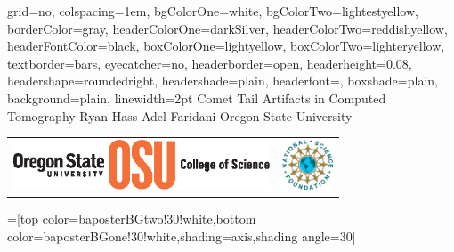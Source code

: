 \documentclass[landscape,final]{baposter}
\begin{document}
\begin{poster}{
  grid=no,
  colspacing=1em,
  bgColorOne=white,
  bgColorTwo=lightestyellow,
  borderColor=gray,
  headerColorOne=darkSilver,
  headerColorTwo=reddishyellow,
  headerFontColor=black,
  boxColorOne=lightyellow,
  boxColorTwo=lighteryellow,
  textborder=bars,
  eyecatcher=no,
  headerborder=open,
  headerheight=0.08\textheight,
  headershape=roundedright,
  headershade=plain,
  headerfont=\Large\textsf, %
  boxshade=plain,
  background=plain,
  linewidth=2pt
  }
  {} %
  {\sf %
  Comet Tail Artifacts in Computed Tomography}
  {\sf %
  Ryan Hass \hspace{3em} Adel Faridani \hspace{3em}
  Oregon State University
  }
  {{\begin{minipage}{30em}
  	
	\begin{tabular}{cc}
    \includegraphics[height=4em]{osu_logo} &
    \includegraphics[height=4em]{nsfe.eps}
    \end{tabular}
  \end{minipage}}
  }

  =[top color=baposterBGtwo!30!white,bottom color=baposterBGone!30!white,shading=axis,shading angle=30]

     \newlength{\leftimgwidth}
     \setlength{\leftimgwidth}{0.78em+8.0em}

    \newcommand{\colouredcircle}[1]{%
      \tikz{\useasboundingbox (-0.2em,-0.32em) rectangle(0.2em,0.32em); \draw[draw=black,fill=baposterBGone!80!black!#1!white,line width=0.03em] (0,0) circle(0.18em);}}


\end{poster}
\end{document}
